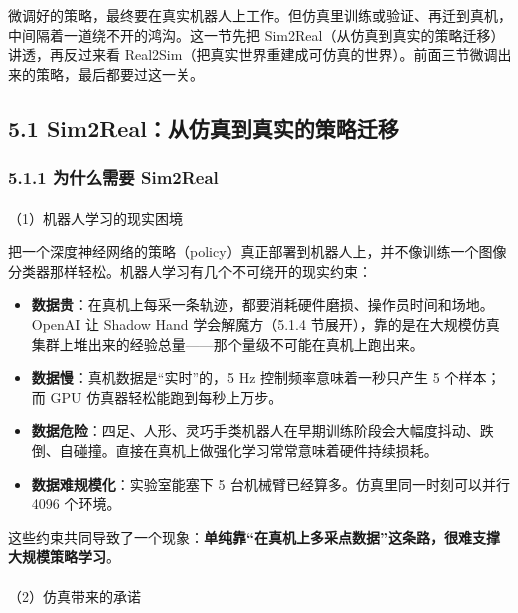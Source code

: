 \documentclass[
  chinese,
]{ctexart}
\makeatletter
\let\oldparagraph\paragraph
\renewcommand{\paragraph}{
    \@ifstar
      \xxxParagraphStar
      \xxxParagraphNoStar
  }
\newcommand{\xxxParagraphStar}[1]{\oldparagraph*{#1}\mbox{}}
\newcommand{\xxxParagraphNoStar}[1]{\oldparagraph{#1}\mbox{}}
\providecommand{\tightlist}{%
  \setlength{\itemsep}{0pt}\setlength{\parskip}{0pt}}
\makeatother
\begin{document}
微调好的策略，最终要在真实机器人上工作。但仿真里训练或验证、再迁到真机，中间隔着一道绕不开的鸿沟。这一节先把
Sim2Real（从仿真到真实的策略迁移）讲透，再反过来看
Real2Sim（把真实世界重建成可仿真的世界）。前面三节微调出来的策略，最后都要过这一关。

\subsection{5.1
Sim2Real：从仿真到真实的策略迁移}\label{sim2realux4eceux4effux771fux5230ux771fux5b9eux7684ux7b56ux7565ux8fc1ux79fb}

\subsubsection{5.1.1 为什么需要
Sim2Real}\label{ux4e3aux4ec0ux4e48ux9700ux8981-sim2real}

\paragraph{（1）机器人学习的现实困境}\label{ux673aux5668ux4ebaux5b66ux4e60ux7684ux73b0ux5b9eux56f0ux5883}

把一个深度神经网络的策略（policy）真正部署到机器人上，并不像训练一个图像分类器那样轻松。机器人学习有几个不可绕开的现实约束：

\begin{itemize}
\tightlist
\item
  \textbf{数据贵}：在真机上每采一条轨迹，都要消耗硬件磨损、操作员时间和场地。OpenAI
  让 Shadow Hand 学会解魔方（5.1.4
  节展开），靠的是在大规模仿真集群上堆出来的经验总量------那个量级不可能在真机上跑出来。
\item
  \textbf{数据慢}：真机数据是``实时''的，5 Hz 控制频率意味着一秒只产生 5
  个样本；而 GPU 仿真器轻松能跑到每秒上万步。
\item
  \textbf{数据危险}：四足、人形、灵巧手类机器人在早期训练阶段会大幅度抖动、跌倒、自碰撞。直接在真机上做强化学习常常意味着硬件持续损耗。
\item
  \textbf{数据难规模化}：实验室能塞下 5
  台机械臂已经算多。仿真里同一时刻可以并行 4096 个环境。
\end{itemize}

这些约束共同导致了一个现象：\textbf{单纯靠``在真机上多采点数据''这条路，很难支撑大规模策略学习}。

\paragraph{（2）仿真带来的承诺}\label{ux4effux771fux5e26ux6765ux7684ux627fux8bfa}
\end{document}
